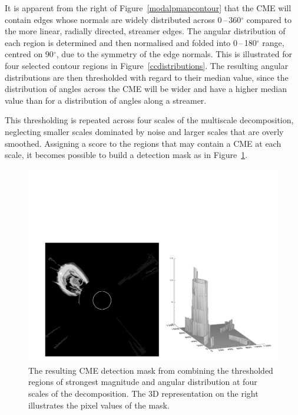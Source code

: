 \documentclass[namedreferences]{SolarPhysics}
\begin{document}
\begin{article}
It is apparent from the right of Figure~\ref{modalpmapcontour} that the CME will contain edges whose normals are widely distributed across 0\,--\,360$^{\circ}$ compared to the more linear, radially directed, streamer edges. The angular distribution of each region is determined and then normalised and folded into 0\,--\,180$^{\circ}$ range, centred on 90$^{\circ}$, due to the symmetry of the edge normals. This is illustrated for four selected contour regions in Figure~\ref{ccdistributions}. The resulting angular distributions are then thresholded with regard to their median value, since the distribution of angles across the CME will be wider and have a higher median value than for a distribution of angles along a streamer.

This thresholding is repeated across four scales of the multiscale decomposition, neglecting smaller scales dominated by noise and larger scales that are overly smoothed. Assigning a score to the regions that may contain a CME at each scale, it becomes possible to build a detection mask as in Figure~\ref{cme_mask}. 
\begin{figure}[!t]
\centerline{\includegraphics[scale=0.55, clip=true, trim=40 20 0 230]{images/cme_mask.pdf}}
\caption{The resulting CME detection mask from combining the thresholded regions of strongest magnitude and angular distribution at four scales of the decomposition. The 3D representation on the right illustrates the pixel values of the mask.}
\label{cme_mask}
\end{figure}


\end{article}
\end{document}
